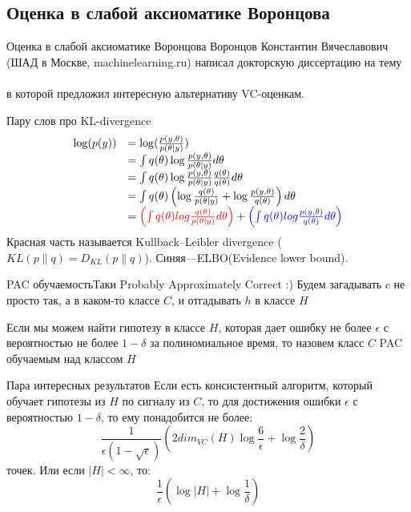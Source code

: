 \documentclass[14pt, fleqn, xcolor={dvipsnames, table}]{beamer}
\begin{document}
\subsection{Оценка в слабой аксиоматике Воронцова}
\begin{frame}{Оценка в слабой аксиоматике Воронцова}
Воронцов Константин Вячеславович (ШАД в Москве, machinelearning.ru) написал докторскую диссертацию на тему \\
 \\
\flushleft в которой предложил интересную альтернативу VC-оценкам.
\end{frame}

\begin{frame}{Пару слов про KL-divergence}
\small
$$\begin{array}{ll}
\log(p(y)) &= \log(\frac{p(y,\theta)}{p(\theta|y)}) \\
&= \int q(\theta) \log \frac{p(y,\theta)}{p(\theta|y)} d\theta \\
&= \int q(\theta) \log \frac{p(y,\theta)}{p(\theta|y)}\frac{q(\theta)}{q(\theta)} d\theta \\
&= \int q(\theta) \left(\log \frac{q(\theta)}{p(\theta|y)} + \log \frac{p(y,\theta)}{q(\theta)}\right) d\theta \\
&= {\color{red}\left(\int q(\theta) log \frac{q(\theta)}{p(\theta|y)}d\theta\right)} + {\color{blue}\left(\int q(\theta) log \frac{p(y,\theta)}{q(\theta)} d\theta\right)} \\
\end{array}$$
Красная часть называется Kullback–Leibler divergence ($KL(p\|q)=D_{KL}(p\|q)$). Синяя---ELBO(Evidence lower bound).
\end{frame}

\begin{frame}{PAC обучаемость}{Таки Probably Approximately Correct :)}
Будем загадывать $c$ не просто так, а в каком-то классе $C$, и отгадывать $h$ в классе $H$
\begin{definition}
Если мы можем найти гипотезу в классе $H$, которая дает ошибку не более $\epsilon$ с вероятностью не более $1 - \delta$ за полиномиальное время, то назовем класс $C$ PAC обучаемым над классом $H$
\end{definition}
\end{frame}

\begin{frame}{Пара интересных результатов}
Если есть консистентный алгоритм, который обучает гипотезы из $H$ по сигналу из $C$, то для достижения ошибки $\epsilon$ с вероятностью $1 - \delta$, то ему понадобится не более:
$$
\frac{1}{\epsilon (1 - \sqrt{\epsilon})}\left(2 dim_{VC} (H) \log\frac{6}{\epsilon} + \log\frac{2}{\delta}\right)
$$
точек. Или если $|H| < \infty$, то:
$$
\frac{1}{\epsilon}\left(\log |H| + \log\frac{1}{\delta}\right)
$$

\end{frame}
\end{document}
